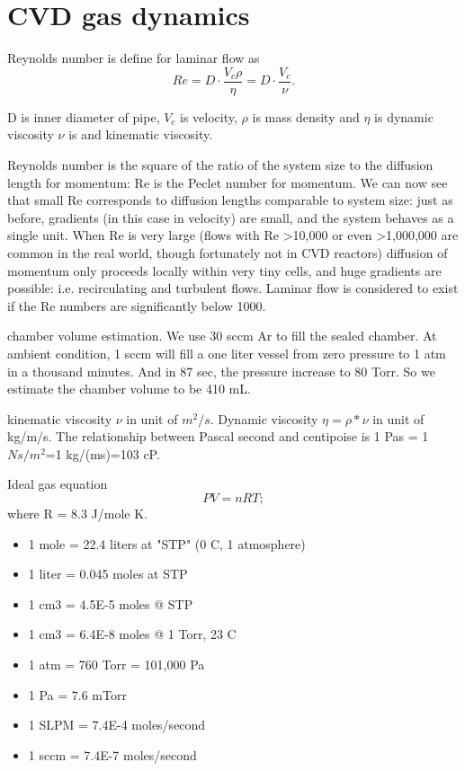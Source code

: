 \chapter{CVD gas dynamics}

Reynolds number is define for laminar flow as
\[
Re = D \cdot \frac{ V_c \rho}{\eta} = D \cdot \frac{ V_c }{\nu}.
\]

D is inner diameter of pipe, $V_c$ is velocity, $\rho$ is mass density and $\eta$ is dynamic viscosity $\nu$ is and kinematic viscosity. 

Reynolds number is the square of the ratio of the system size to the diffusion length for momentum: Re is the Peclet number for momentum. We can now see that small Re corresponds to diffusion lengths comparable to system size: just as before, gradients (in this case in velocity) are small, and the system behaves as a single unit. When Re is very large (flows with Re \textgreater 10,000 or even \textgreater 1,000,000 are common in the real world, though fortunately not in CVD reactors) diffusion of momentum only proceeds locally within very tiny cells, and huge gradients are possible: i.e. recirculating and turbulent flows. Laminar flow is considered to exist if the Re numbers are significantly below 1000.

chamber volume estimation. We use 30 sccm Ar to fill the sealed chamber. At ambient condition, 1 sccm will fill a one liter vessel from zero pressure to 1 atm in a thousand minutes. And in 87 sec, the pressure increase to 80 Torr. So we estimate the chamber volume to be 410 mL.

kinematic viscosity $\nu$ in unit of $m^2/s$. Dynamic viscosity $\eta = \rho*\nu$ in unit of kg/m/s. The relationship between Pascal second and centipoise is 1 Pas = 1 $Ns/m^2$=1 kg/(ms)=103 cP.

Ideal gas equation
\[
PV = n R T;
\]
where R = 8.3 J/mole K.

\begin{itemize}
\item 1 mole = 22.4 liters at "STP" (0 C, 1 atmosphere)
\item 1 liter = 0.045 moles at STP
\item 1 cm3 = 4.5E-5 moles @ STP
\item 1 cm3 = 6.4E-8 moles @ 1 Torr, 23 C
\item 1 atm = 760 Torr = 101,000 Pa
\item 1 Pa = 7.6 mTorr
\item 1 SLPM = 7.4E-4 moles/second
\item 1 sccm = 7.4E-7 moles/second
\end{itemize}

